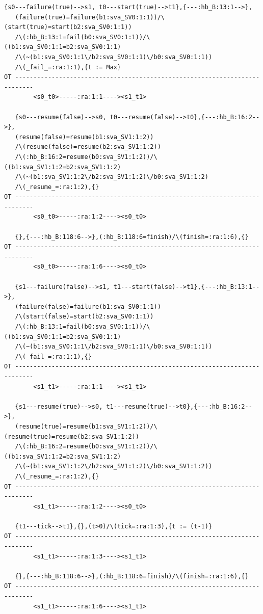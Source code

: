 \documentclass{lncs/llncs}
\begin{document}
\newpage
\begin{lstlisting}[basicstyle=\scriptsize\ttfamily, frame=single]
   {s0---failure(true)-->s1, t0---start(true)-->t1},{---:hb_B:13:1-->},   
   (failure(true)=failure(b1:sva_SV0:1:1))/\(start(true)=start(b2:sva_SV0:1:1))
   /\(:hb_B:13:1=fail(b0:sva_SV0:1:1))/\((b1:sva_SV0:1:1=b2:sva_SV0:1:1)
   /\(~(b1:sva_SV0:1:1\/b2:sva_SV0:1:1)\/b0:sva_SV0:1:1))
   /\(_fail_=:ra:1:1),{t := Max}
OT ---------------------------------------------------------------------------
        <s0_t0>-----:ra:1:1----><s1_t1>

   {s0---resume(false)-->s0, t0---resume(false)-->t0},{---:hb_B:16:2-->},   
   (resume(false)=resume(b1:sva_SV1:1:2))
   /\(resume(false)=resume(b2:sva_SV1:1:2))
   /\(:hb_B:16:2=resume(b0:sva_SV1:1:2))/\((b1:sva_SV1:1:2=b2:sva_SV1:1:2)
   /\(~(b1:sva_SV1:1:2\/b2:sva_SV1:1:2)\/b0:sva_SV1:1:2)
   /\(_resume_=:ra:1:2),{}
OT ---------------------------------------------------------------------------
        <s0_t0>-----:ra:1:2----><s0_t0>

   {},{---:hb_B:118:6-->},(:hb_B:118:6=finish)/\(finish=:ra:1:6),{}
OT ---------------------------------------------------------------------------
        <s0_t0>-----:ra:1:6----><s0_t0>
 
   {s1---failure(false)-->s1, t1---start(false)-->t1},{---:hb_B:13:1-->},   
   (failure(false)=failure(b1:sva_SV0:1:1))
   /\(start(false)=start(b2:sva_SV0:1:1))
   /\(:hb_B:13:1=fail(b0:sva_SV0:1:1))/\((b1:sva_SV0:1:1=b2:sva_SV0:1:1)
   /\(~(b1:sva_SV0:1:1\/b2:sva_SV0:1:1)\/b0:sva_SV0:1:1))
   /\(_fail_=:ra:1:1),{}
OT ---------------------------------------------------------------------------
        <s1_t1>-----:ra:1:1----><s1_t1>

   {s1---resume(true)-->s0, t1---resume(true)-->t0},{---:hb_B:16:2-->},   
   (resume(true)=resume(b1:sva_SV1:1:2))/\(resume(true)=resume(b2:sva_SV1:1:2))
   /\(:hb_B:16:2=resume(b0:sva_SV1:1:2))/\((b1:sva_SV1:1:2=b2:sva_SV1:1:2)
   /\(~(b1:sva_SV1:1:2\/b2:sva_SV1:1:2)\/b0:sva_SV1:1:2))
   /\(_resume_=:ra:1:2),{}
OT ---------------------------------------------------------------------------
        <s1_t1>-----:ra:1:2----><s0_t0>

   {t1---tick-->t1},{},(t>0)/\(tick=:ra:1:3),{t := (t-1)}
OT ---------------------------------------------------------------------------
        <s1_t1>-----:ra:1:3----><s1_t1>

   {},{---:hb_B:118:6-->},(:hb_B:118:6=finish)/\(finish=:ra:1:6),{}
OT ---------------------------------------------------------------------------
        <s1_t1>-----:ra:1:6----><s1_t1>


\end{lstlisting}
\end{document}

